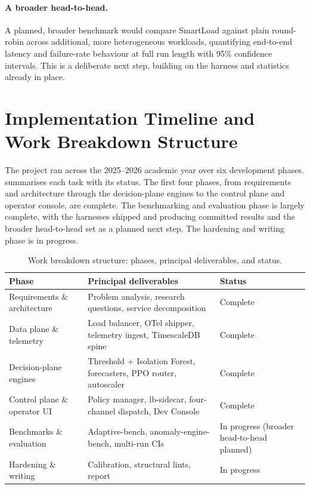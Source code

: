 \paragraph{A broader head-to-head.} A planned, broader benchmark would compare
SmartLoad against plain round-robin across additional, more heterogeneous workloads,
quantifying end-to-end latency and failure-rate behaviour at full run length with 95\%
confidence intervals. This is a deliberate next step, building on the harness and
statistics already in place.

\section{Implementation Timeline and Work Breakdown Structure}\label{imc:wbs}

The project ran across the 2025--2026 academic year over six development phases.
 summarises each task with its status. The first four phases, from
requirements and architecture through the decision-plane engines to the control plane
and operator console, are complete. The benchmarking and evaluation phase is largely
complete, with the harnesses shipped and producing committed results and the broader
head-to-head set as a planned next step. The hardening and writing phase is in
progress.

\begin{table}[H]
  \centering
  \caption[Work breakdown structure phases and status]{Work breakdown structure: phases, principal deliverables, and status.}
  \label{tab:imc:wbs}
  \small
  \begin{tabularx}{\linewidth}{@{}l Y l@{}}
    \toprule
    \textbf{Phase} & \textbf{Principal deliverables} & \textbf{Status} \\
    \midrule
    Requirements \& architecture & Problem analysis, research questions, service decomposition & Complete \\
    Data plane \& telemetry & Load balancer, OTel shipper, telemetry ingest, TimescaleDB spine & Complete \\
    Decision-plane engines & Threshold + Isolation Forest, forecasters, PPO router, autoscaler & Complete \\
    Control plane \& operator UI & Policy manager, lb-sidecar, four-channel dispatch, Dev Console & Complete \\
    Benchmarks \& evaluation & Adaptive-bench, anomaly-engine-bench, multi-run CIs & In progress (broader head-to-head planned) \\
    Hardening \& writing & Calibration, structural lints, report & In progress \\
    \bottomrule
  \end{tabularx}
\end{table}

